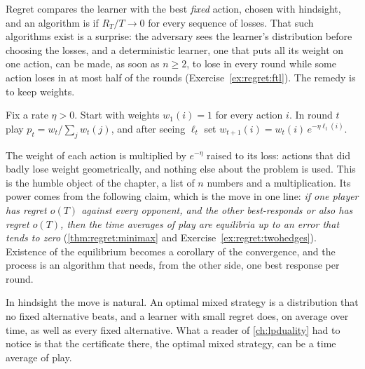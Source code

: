 \begin{refsection}
Regret compares the learner with the best \emph{fixed} action, chosen with hindsight, and an algorithm is  if $R_T/T\to0$ for every sequence of losses. That such algorithms exist is a surprise: the adversary sees the learner's distribution before choosing the losses, and a deterministic learner, one that puts all its weight on one action, can be made, as soon as $n\ge2$, to lose in every round while some action loses in at most half of the rounds (Exercise~\ref{ex:regret:ftl}). The remedy is to keep weights.

\begin{definition}[Hedge]\label{def:regret:hedge}
Fix a rate $\eta>0$. Start with weights $w_1(i)=1$ for every action $i$. In round $t$ play $p_t=w_t/\sum_jw_t(j)$, and after seeing $\ell_t$ set $w_{t+1}(i)=w_t(i)\,e^{-\eta\ell_t(i)}$.
\end{definition}

The weight of each action is multiplied by $e^{-\eta}$ raised to its loss: actions that did badly lose weight geometrically, and nothing else about the problem is used. This is the humble object of the chapter, a list of $n$ numbers and a multiplication. Its power comes from the following claim, which is the move in one line: \emph{if one player has regret $o(T)$ against every opponent, and the other best-responds or also has regret $o(T)$, then the time averages of play are equilibria up to an error that tends to zero} (\cref{thm:regret:minimax} and Exercise~\ref{ex:regret:twohedges}). Existence of the equilibrium becomes a corollary of the convergence, and the process is an algorithm that needs, from the other side, one best response per round.

In hindsight the move is natural. An optimal mixed strategy is a distribution that no fixed alternative beats, and a learner with small regret does, on average over time, as well as every fixed alternative. What a reader of \cref{ch:lpduality} had to notice is that the certificate there, the optimal mixed strategy, can be a time average of play.


\end{refsection}
